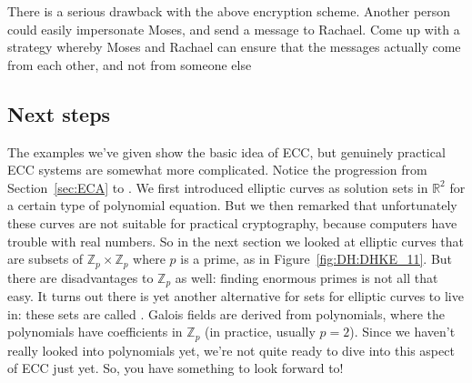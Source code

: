 \begin{exercise}\label{exercise:further_crypt:}
There is a serious drawback with the above encryption scheme. Another person could easily impersonate Moses, and send a message to Rachael. Come up with a strategy whereby Moses and Rachael can ensure that the messages actually come from each other, and not from someone else 
\end{exercise}

\subsection{Next steps}
The examples we've given show the basic idea of ECC, but genuinely practical ECC systems are somewhat more complicated. Notice the progression from Section~\ref{sec:ECA} to \label{sec:ECA2}. We first introduced elliptic curves as solution sets in $\mathbb{R}^2$ for a certain type of polynomial equation. But we then remarked that unfortunately these curves are not suitable for practical cryptography, because computers have trouble with real numbers. So in the next section we looked at elliptic curves that are subsets of $\mathbb{Z}_p \times \mathbb{Z}_p$ where $p$ is a prime, as in Figure~\ref{fig:DH:DHKE_11}. But there are disadvantages to $\mathbb{Z}_p$ as well: finding enormous primes is not all that easy. It turns out there is yet another alternative for sets for elliptic curves to live in:  these sets are called . Galois fields are derived from polynomials, where the polynomials have coefficients in $\mathbb{Z}_p$ (in practice, usually $p=2$).  Since we haven't really looked into polynomials yet, we're not quite ready to dive into this aspect of ECC just yet.  So, you have something to look forward to! 

